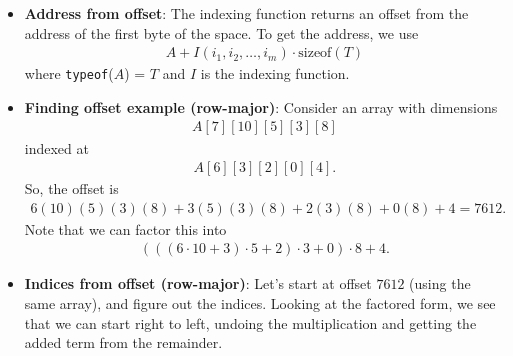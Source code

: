 \documentclass{report}
\begin{document}
\begin{itemize}
\begin{itemize}
                     \item then $i_{3} $
                     \item and so on
                 \end{itemize}
                 Notice that in both formulas, either $n_{1}$ (row-major) is never used, or $n_{m}$ (column-major) is never used. That is exactly why, in a function parameter, the compiler must know the later dimensions, but not the first one. For example, in c++ 
                 \bigbreak \noindent 
                 \begin{cppcode}
                     void fn(int arr[][10]);
                 \end{cppcode}
                 \bigbreak \noindent 
                 is valid.
        \item \textbf{Address from offset}: The indexing function returns an offset from the address of the first byte of the space. To get the address, we use
            \begin{align*}
                A + I(i_{1}, i_{2}, \dots, i_{m}) \cdot \text{sizeof}(T)
            \end{align*}
            where \texttt{typeof}($A$) = $T$ and $I$ is the indexing function.
        \item \textbf{Finding offset example (row-major)}: Consider an array with dimensions
            \begin{align*}
                A[7][10][5][3][8]
            \end{align*}
            indexed at
            \begin{align*}
                A[6][3][2][0][4]
            .\end{align*}
            So, the offset is 
            \begin{align*}
                6(10)(5)(3)(8) + 3(5)(3)(8) + 2(3)(8) + 0(8) + 4 = 7612
            .\end{align*}
            Note that we can factor this into
            \begin{align*}
                (((6 \cdot 10 + 3) \cdot 5 + 2) \cdot 3 + 0) \cdot  8 + 4
            .\end{align*}
        \item \textbf{Indices from offset (row-major)}: Let's start at offset $7612$ (using the same array), and figure out the indices. Looking at the factored form, we see that we can start right to left, undoing the multiplication and getting the added term from the remainder.
            \begin{align*}

\end{align*}
\end{itemize}
\end{document}
